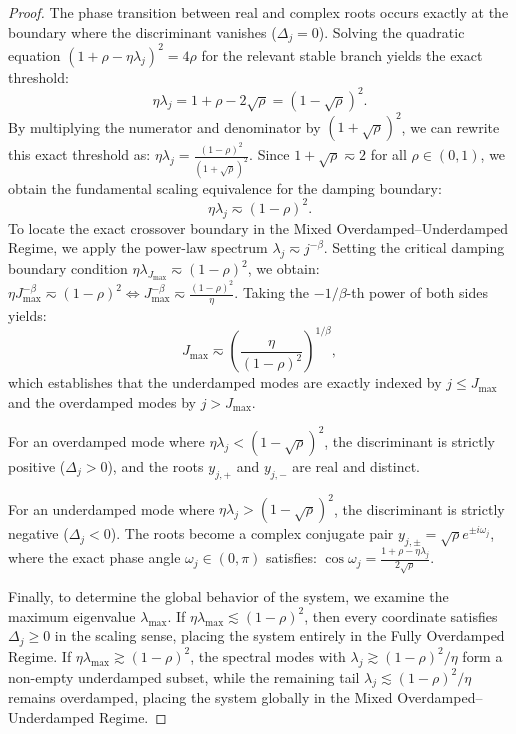 \begin{proof}
The phase transition between real and complex roots occurs exactly at the boundary where the discriminant vanishes ($\Delta_j = 0$). Solving the quadratic equation $(1+\rho-\eta\lambda_j)^2 = 4\rho$ for the relevant stable branch yields the exact threshold:
\[
    \eta\lambda_j = 1 + \rho - 2\sqrt{\rho} = (1-\sqrt{\rho})^2.
\]
By multiplying the numerator and denominator by $(1+\sqrt{\rho})^2$, we can rewrite this exact threshold as: $\eta\lambda_j = \frac{(1-\rho)^2}{(1+\sqrt{\rho})^2}.$
Since $1+\sqrt{\rho} \eqsim 2$ for all $\rho \in (0, 1)$, we obtain the fundamental scaling equivalence for the damping boundary:
\[
    \eta\lambda_j \eqsim (1-\rho)^2.
\]
To locate the exact crossover boundary in the Mixed Overdamped--Underdamped Regime, we apply the power-law spectrum $\lambda_j \eqsim j^{-\beta}$. Setting the critical damping boundary condition $\eta\lambda_{J_{\max}} \eqsim (1-\rho)^2$, we obtain: 
$\eta J_{\max}^{-\beta} \eqsim (1-\rho)^2  \Longleftrightarrow  J_{\max}^{-\beta} \eqsim \frac{(1-\rho)^2}{\eta}.$
Taking the $-1/\beta$-th power of both sides yields:
\[
    J_{\max} \eqsim \left(\frac{\eta}{(1-\rho)^2}\right)^{1/\beta},
\]
which establishes that the underdamped modes are exactly indexed by $j \le J_{\max}$ and the overdamped modes by $j > J_{\max}$.

For an overdamped mode where $\eta\lambda_j < (1-\sqrt{\rho})^2$, the discriminant is strictly positive ($\Delta_j > 0$), and the roots $y_{j,+}$ and $y_{j,-}$ are real and distinct.

For an underdamped mode where $\eta\lambda_j > (1-\sqrt{\rho})^2$, the discriminant is strictly negative ($\Delta_j < 0$). The roots become a complex conjugate pair $y_{j,\pm} = \sqrt{\rho} e^{\pm i \omega_j}$, where the exact phase angle $\omega_j \in (0, \pi)$ satisfies:
$\cos\omega_j = \frac{1+\rho-\eta\lambda_j}{2\sqrt{\rho}}.$

Finally, to determine the global behavior of the system, we examine the maximum eigenvalue $\lambda_{\max}$. If $\eta\lambda_{\max} \lesssim (1-\rho)^2$, then every coordinate satisfies $\Delta_j \ge 0$ in the scaling sense, placing the system entirely in the Fully Overdamped Regime. If $\eta\lambda_{\max} \gtrsim (1-\rho)^2$, the spectral modes with $\lambda_j \gtrsim (1-\rho)^2/\eta$ form a non-empty underdamped subset, while the remaining tail $\lambda_j \lesssim (1-\rho)^2/\eta$ remains overdamped, placing the system globally in the Mixed Overdamped--Underdamped Regime.
\end{proof}

